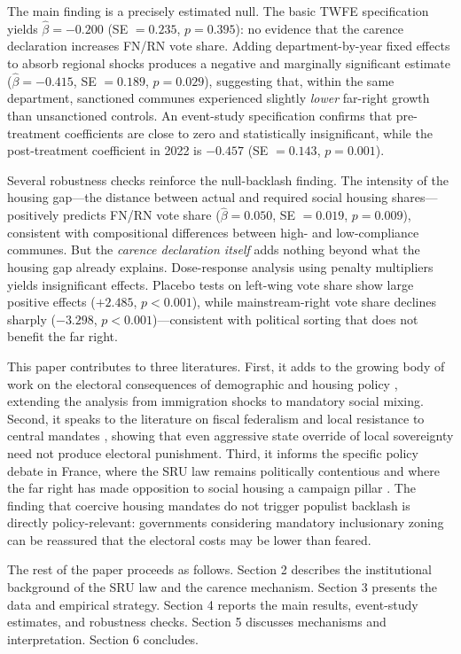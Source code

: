 \documentclass[12pt]{article}
\begin{document}
The main finding is a precisely estimated null. The basic TWFE specification yields $\hat{\beta} = -0.200$ (SE $= 0.235$, $p = 0.395$): no evidence that the carence declaration increases FN/RN vote share. Adding department-by-year fixed effects to absorb regional shocks produces a negative and marginally significant estimate ($\hat{\beta} = -0.415$, SE $= 0.189$, $p = 0.029$), suggesting that, within the same department, sanctioned communes experienced slightly \textit{lower} far-right growth than unsanctioned controls. An event-study specification confirms that pre-treatment coefficients are close to zero and statistically insignificant, while the post-treatment coefficient in 2022 is $-0.457$ (SE $= 0.143$, $p = 0.001$).

Several robustness checks reinforce the null-backlash finding. The intensity of the housing gap---the distance between actual and required social housing shares---positively predicts FN/RN vote share ($\hat{\beta} = 0.050$, SE $= 0.019$, $p = 0.009$), consistent with compositional differences between high- and low-compliance communes. But the \textit{carence declaration itself} adds nothing beyond what the housing gap already explains. Dose-response analysis using penalty multipliers yields insignificant effects. Placebo tests on left-wing vote share show large positive effects ($+2.485$, $p < 0.001$), while mainstream-right vote share declines sharply ($-3.298$, $p < 0.001$)---consistent with political sorting that does not benefit the far right.

This paper contributes to three literatures. First, it adds to the growing body of work on the electoral consequences of demographic and housing policy \citep{dustmann2019, steinmayr2021, edo2019, caselli2021}, extending the analysis from immigration shocks to mandatory social mixing. Second, it speaks to the literature on fiscal federalism and local resistance to central mandates \citep{epple2010}, showing that even aggressive state override of local sovereignty need not produce electoral punishment. Third, it informs the specific policy debate in France, where the SRU law remains politically contentious and where the far right has made opposition to social housing a campaign pillar \citep{algan2022, autor2020}. The finding that coercive housing mandates do not trigger populist backlash is directly policy-relevant: governments considering mandatory inclusionary zoning can be reassured that the electoral costs may be lower than feared.

The rest of the paper proceeds as follows. Section 2 describes the institutional background of the SRU law and the carence mechanism. Section 3 presents the data and empirical strategy. Section 4 reports the main results, event-study estimates, and robustness checks. Section 5 discusses mechanisms and interpretation. Section 6 concludes.
\end{document}
